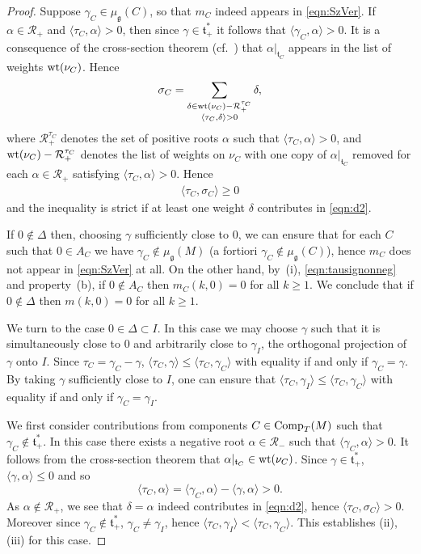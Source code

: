 \documentclass[11pt]{article}
\numberwithin{equation}{section}
\newcommand{\pair}[2]{\langle #1, #2 \rangle}
\newcommand{\tn}[1]{\textnormal{#1}}
\def\g{\ensuremath{\mathfrak{g}}}
\def\t{\ensuremath{\mathfrak{t}}}
\def\R{\ensuremath{\mathcal{R}}}
\begin{document}
\begin{proof}
Suppose $\gamma_C \in \mu_\g(C)$, so that $m_C$ indeed appears in \eqref{eqn:SzVer}. If $\alpha \in \R_+$ and $\pair{\tau_C}{\alpha}>0$, then since $\gamma \in \t^\ast_+$ it follows that $\pair{\gamma_C}{\alpha}>0$. It is a consequence of the cross-section theorem (cf.~\cite{ConvexitySympCuts}) that $\alpha|_{\t_C}$ appears in the list of weights $\tn{wt}(\nu_C)$. Hence
\begin{gather}\label{eqn:d2}
\sigma_C=\sum_{\substack{\delta \in \tn{wt}(\nu_C)-\R_+^{\tau_C}\\ \pair{\tau_C}{\delta}>0}} \delta,
\end{gather}
where $\R_+^{\tau_C}$ denotes the set of positive roots $\alpha$ such that $\pair{\tau_C}{\alpha}>0$, and $\tn{wt}(\nu_C)-\R_+^{\tau_C}$ denotes the list of weights on $\nu_C$ with one copy of $\alpha|_{\t_C}$ removed for each $\alpha \in \R_+$ satisfying $\pair{\tau_C}{\alpha}>0$. Hence{\samepage
\begin{gather}\label{eqn:tausignonneg}
\pair{\tau_C}{\sigma_C}\ge 0
\end{gather}
and the inequality is strict if at least one weight $\delta$ contributes in \eqref{eqn:d2}.}

If $0 \notin \Delta$ then, choosing $\gamma$ sufficiently close to $0$, we can ensure that for each $C$ such that $0 \in A_C$ we have $\gamma_C \notin \mu_\g(M)$ (a fortiori $\gamma_C \notin \mu_\g(C)$), hence $m_C$ does not appear in \eqref{eqn:SzVer} at all. On the other hand, by~(i), \eqref{eqn:tausignonneg} and property~(b), if $0 \notin A_C$ then $m_C(k,0)=0$ for all $k \ge 1$. We conclude that if $0 \notin \Delta$ then $m(k,0)=0$ for all $k \ge 1$.

We turn to the case $0 \in \Delta \subset I$. In this case we may choose $\gamma$ such that it is simultaneously close to $0$ and arbitrarily close to $\gamma_I$, the orthogonal projection of $\gamma$ onto $I$. Since $\tau_C=\gamma_C-\gamma$, $\pair{\tau_C}{\gamma}\le \pair{\tau_C}{\gamma_C}$ with equality if and only if $\gamma_C=\gamma$. By taking $\gamma$ sufficiently close to $I$, one can ensure that $\pair{\tau_C}{\gamma_I}\le \pair{\tau_C}{\gamma_C}$ with equality if and only if $\gamma_C=\gamma_I$.

We first consider contributions from components $C \in \tn{Comp}_T(M)$ such that $\gamma_C \notin \t_+^\ast$. In this case there exists a negative root $\alpha \in \R_-$ such that $\pair{\gamma_C}{\alpha}>0$. It follows from the cross-section theorem that $\alpha|_{\t_C} \in \tn{wt}(\nu_C)$. Since $\gamma \in \t_+^\ast$, $\pair{\gamma}{\alpha}\le 0$ and so
\[ \pair{\tau_C}{\alpha}=\pair{\gamma_C}{\alpha}-\pair{\gamma}{\alpha}>0. \]
As $\alpha \notin \R_+$, we see that $\delta=\alpha$ indeed contributes in \eqref{eqn:d2}, hence $\pair{\tau_C}{\sigma_C}>0$. Moreover since $\gamma_C \notin \t_+^\ast$, $\gamma_C \ne \gamma_I$, hence $\pair{\tau_C}{\gamma_I}<\pair{\tau_C}{\gamma_C}$. This establishes (ii), (iii) for this case.


\end{proof}
\end{document}
